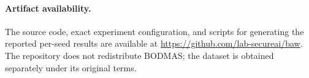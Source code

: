 \paragraph{Artifact availability.}
The source code, exact experiment configuration, and scripts for generating
the reported per-seed results are available at
\url{https://github.com/lab-secureai/baw}.
The repository does not redistribute BODMAS; the dataset is obtained separately
under its original terms.
